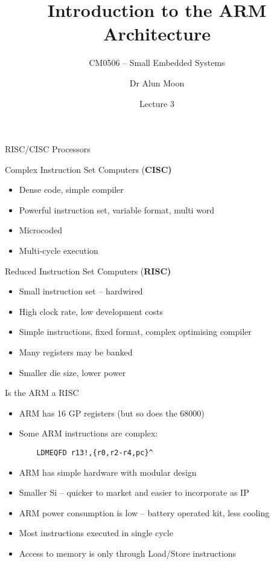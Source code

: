 \documentclass[svgnames,x11names]{beamer}
\title{Introduction to the ARM Architecture}
\subtitle{CM0506 -- Small Embedded Systems}
\date{Lecture 3}
\author{Dr Alun Moon}
\institute{Department of Computer and Information Science}
\begin{document}
\frame\maketitle

\begin{frame}{RISC/CISC Processors}{}
  \begin{block}{Complex Instruction Set Computers (\bfseries{CISC})}
    \begin{itemize}
    \item Dense code, simple compiler
    \item Powerful instruction set,
      variable format, multi word
    \item Microcoded
    \item Multi-cycle execution
    \end{itemize}
  \end{block}
  \begin{block}{Reduced Instruction Set Computers (\bfseries{RISC})}
    \begin{itemize}
    \item Small instruction set -- hardwired
    \item High clock rate, low development costs
    \item Simple instructions, fixed format, complex optimising
      compiler
    \item Many registers may be banked
    \item Smaller die
      size, lower power
    \end{itemize}
  \end{block}
\end{frame}

\begin{frame}[fragile]{Is the ARM a RISC}
  \begin{itemize}
  \item ARM has 16 GP registers (but so does the 68000) 
  \item Some ARM instructions are complex: 
\begin{verbatim}
    LDMEQFD r13!,{r0,r2-r4,pc}^ 
\end{verbatim}
  \item ARM has simple hardware with modular design 
  \item Smaller Si -- quicker to market and easier to incorporate as
    IP
  \item ARM power consumption is low -- battery operated kit, less
    cooling
  \item Most instructions executed in single cycle
  \item Access to memory is only through Load/Store instructions
  \end{itemize}
\end{frame}
\end{document}
